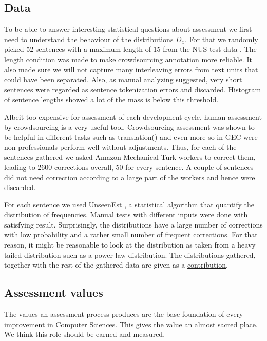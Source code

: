 \documentclass[english]{article}
\begin{document}
\subsection{Data}
To be able to answer interesting statistical questions about assessment we first need to understand the behaviour of the distributions $D_x$. For that we randomly picked 52 sentences with a maximum length of 15 from the NUS test data \cite{dahlmeier2013building}. The length condition was made to make crowdsourcing annotation more reliable. It also made sure we will not capture many interleaving errors from text units that could have been separated. Also, as manual analyzing suggested, very short sentences were regarded as sentence tokenization errors and discarded. Histogram of sentence lengths showed a lot of the mass is below this threshold.

Albeit too expensive for assessment of each development cycle, human assessment by crowdsourcing is a very useful tool. Crowdsourcing assessment was shown to be helpful in different tasks such as translation(\cite{birch2016hume,zaidan2011crowdsourcing,post2012constructing}) and even more so in GEC \cite{madnani2011they} were non-professionals perform well without adjustments. Thus, for each of the sentences gathered we asked Amazon Mechanical Turk workers to correct them, leading to 2600 corrections overall, 50 for every sentence. A couple of sentences did not need correction according to a large part of the workers and hence were discarded.

For each sentence we used UnseenEst \cite{zou2015quantifying}, a statistical algorithm that quantify the distribution of frequencies. Manual tests with different inputs were done with satisfying result. Surprisingly, the distributions have a large number of corrections with low probability and a rather small number of frequent corrections. For that reason, it might be reasonable to look at the distribution as taken from a heavy tailed distribution such as a power law distribution. The distributions gathered, together with the rest of the gathered data are given as a \href{https://github.com/borgr/assess_learner_language}{contribution}.

\subsection{Assessment values}\label{sec:Assessment-values}

The values an assessment process produces are the base foundation of
 every improvement in Computer Sciences. This gives the value an
  almost sacred place. We think this role should be earned and measured.
 
\end{document}

